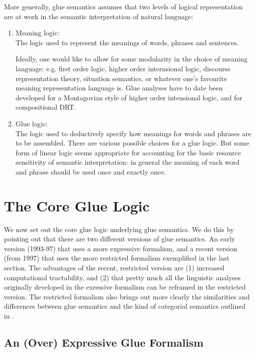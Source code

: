 More generally, glue semantics assumes that two levels of logical
representation are
at work in the semantic interpretation of natural language:
\begin{enumerate}
\item Meaning logic:\\
The logic used to represent the meanings of words, phrases and sentences.

Ideally, one would like to allow for some modularity in the choice
of meaning language: e.g. first order logic, higher order internsional
logic, discourse representation theory, situation semantics, or whatever
one's favourite meaning representation language is. Glue analyses have
to date been developed for a Montagovian style of higher order intensional
logic, and for compositional DRT. 

\item Glue logic:\\
The logic used to deductively specify how meanings for words and phrases
are to be assembled.   There are various possible choices for
a glue logic. But some form of linear logic seems appropriate for accounting
for the basic resource sensitivity of semantic interpretation:
 in general the meaning of each word and phrase should be used once
and exactly once.
\end{enumerate} 

\section{The Core Glue Logic}

We now set out the core glue logic underlying glue semantics.  We do this
by pointing out that there are  two different versions of glue
semantics.  An early version (1993-97) that uses a more expressive
formalism, and a recent version (from 1997) that uses the more 
restricted formalism exemplified in the last section.  The advantages of
the recent, restricted version are (1) increased computational tractability,
and (2) that pretty much all the linguistic analyses originally
developed in the exressive formalism can be reframed in the 
restricted version. The restricted formalism also brings out more clearly
the similarities and differences between glue semantics and the
kind of categorial semantics outlined in .

\subsection{An (Over) Expressive Glue Formalism}

